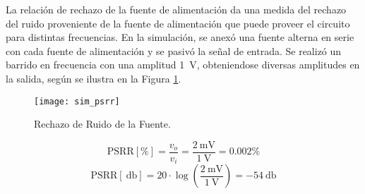 La relación de rechazo de la fuente de alimentación da una medida del rechazo del ruido proveniente de la fuente de alimentación que puede proveer el circuito para distintas frecuencias. En la simulación, se anexó una fuente alterna en serie con cada fuente de alimentación y se pasivó la señal de entrada. Se realizó un barrido en frecuencia con una amplitud \SI{1}{\volt}, obteniendose diversas amplitudes en la salida, según se ilustra en la Figura \ref{fig:psrr}.
\begin{figure}[H]
	\centering
	\texttt{[image: sim\_psrr]}
	\caption{Rechazo de Ruido de la Fuente.}
	\label{fig:psrr}
\end{figure}

$$ \mathrm{PSRR} [\%]= \frac{v_o}{v_i} = \frac{\SI{2}{\milli\volt}}{\SI{1}{\volt}} = \num{0,002} \%$$
$$ \mathrm{PSRR} [\SI{}{\decibel}] = 20 \cdot \log \left( \frac{\SI{2}{\milli\volt}}{\SI{1}{\volt}} \right) = \SI{-54}{\decibel} $$